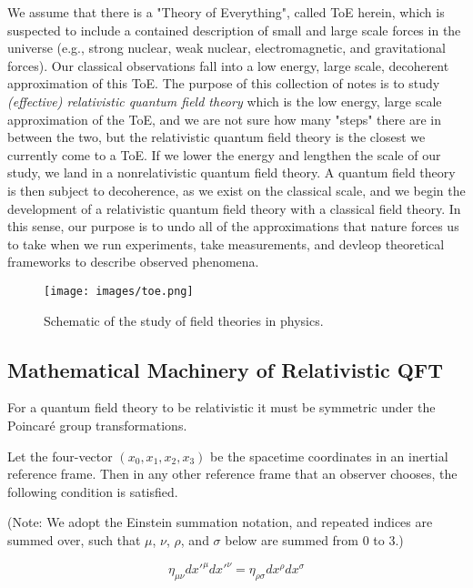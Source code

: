 We assume that there is a "Theory of Everything", called ToE herein, which is suspected to include a contained description of small and large scale forces in the universe (e.g., strong nuclear, weak nuclear, electromagnetic, and gravitational forces). Our classical observations fall into a low energy, large scale, decoherent approximation of this ToE. The purpose of this collection of notes is to study \textit{(effective) relativistic quantum field theory} which is the low energy, large scale approximation of the ToE, and we are not sure how many "steps" there are in between the two, but the relativistic quantum field theory is the closest we currently come to a ToE. If we lower the energy and lengthen the scale of our study, we land in a nonrelativistic quantum field theory. A quantum field theory is then subject to decoherence, as we exist on the classical scale, and we begin the development of a relativistic quantum field theory with a classical field theory. In this sense, our purpose is to undo all of the approximations that nature forces us to take when we run experiments, take measurements, and devleop theoretical frameworks to describe observed phenomena.

\begin{figure}[H]
	\centering
	\texttt{[image: images/toe.png]}
	\caption{Schematic of the study of field theories in physics.}
	\label{fig:fig1}
\end{figure}

\clearpage

\subsection*{Mathematical Machinery of Relativistic QFT}

For a quantum field theory to be relativistic it must be symmetric under the Poincar\'e group transformations.

\noindent Let the four-vector $(x_0, x_1, x_2, x_3)$ be the spacetime coordinates in an inertial reference frame. Then in any other reference frame that an observer chooses, the following condition is satisfied. 

\noindent (Note: We adopt the Einstein summation notation, and repeated indices are summed over, such that $\mu$, $\nu$, $\rho$, and $\sigma$ below are summed from $0$ to $3$.)

\begin{equation}
\eta_{\mu\nu} dx'^\mu dx'^\nu = \eta_{\rho\sigma} dx^\rho dx^\sigma
\end{equation}

